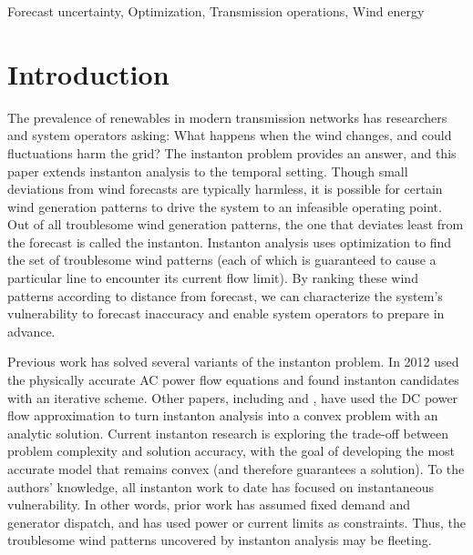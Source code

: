 \documentclass[conference]{IEEEtran}
\begin{document}
\begin{IEEEkeywords}
Forecast uncertainty, Optimization, Transmission operations, Wind energy
\end{IEEEkeywords}


\section{Introduction}

The prevalence of renewables in modern transmission networks has researchers and system operators asking: What happens when the wind changes, and could fluctuations harm the grid? The instanton problem provides an answer, and this paper extends instanton analysis to the temporal setting. Though small deviations from wind forecasts are typically harmless, it is possible for certain wind generation patterns to drive the system to an infeasible operating point. Out of all troublesome wind generation patterns, the one that deviates least from the forecast is called the instanton. Instanton analysis uses optimization to find the set of troublesome wind patterns (each of which is guaranteed to cause a particular line to encounter its current flow limit). By ranking these wind patterns according to distance from forecast, we can characterize the system's vulnerability to forecast inaccuracy and enable system operators to prepare in advance.

Previous work has solved several variants of the instanton problem. In 2012 \cite{baghsorkhi2012} used the physically accurate AC power flow equations and found instanton candidates with an iterative scheme. Other papers, including \cite{chertkov2011} and \cite{chertkov2011a}, have used the DC power flow approximation to turn instanton analysis into a convex problem with an analytic solution. Current instanton research is exploring the trade-off between problem complexity and solution accuracy, with the goal of developing the most accurate model that remains convex (and therefore guarantees a solution). To the authors' knowledge, all instanton work to date has focused on instantaneous vulnerability. In other words, prior work has assumed fixed demand and generator dispatch, and has used power or current limits as constraints. Thus, the troublesome wind patterns uncovered by instanton analysis may be fleeting.
\end{document}
